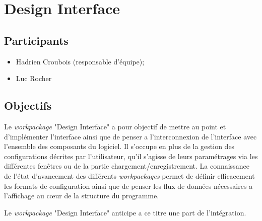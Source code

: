 


\maketitle
\newpage

\tableofcontents
\newpage
\section{Design Interface}
\subsection{Participants}
\begin{itemize}
    \item Hadrien Croubois (responsable d'équipe);
    \item Luc Rocher
\end{itemize}
\subsection{Objectifs}
\par Le \emph{workpackage} "Design Interface" a pour objectif de mettre au point et d'implémenter l'interface ainsi que de penser a l’interconnexion de l'interface avec l'ensemble des composants du logiciel. Il s'occupe en plus de la gestion des configurations décrites par l'utilisateur, qu'il s'agisse de leurs paramétrages via les différentes fenêtres ou de la partie chargement/enregistrement. La connaissance de l'état d'avancement des différents \emph{workpackages} permet de définir efficacement les formats de configuration ainsi que de penser les flux de données nécessaires a l'affichage au cœur de la structure du programme.
\par Le \emph{workpackage} "Design Interface" anticipe a ce titre une part de l’intégration.
